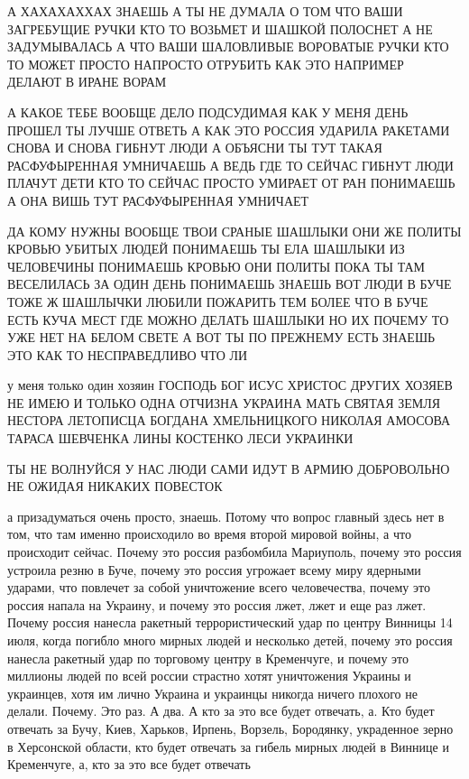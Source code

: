 А ХАХАХАХХАХ ЗНАЕШЬ А ТЫ НЕ ДУМАЛА О ТОМ ЧТО ВАШИ ЗАГРЕБУЩИЕ РУЧКИ КТО ТО
ВОЗЬМЕТ И ШАШКОЙ ПОЛОСНЕТ А НЕ ЗАДУМЫВАЛАСЬ А ЧТО ВАШИ ШАЛОВЛИВЫЕ ВОРОВАТЫЕ
РУЧКИ КТО ТО МОЖЕТ ПРОСТО НАПРОСТО ОТРУБИТЬ КАК ЭТО НАПРИМЕР ДЕЛАЮТ В ИРАНЕ
ВОРАМ

А КАКОЕ ТЕБЕ ВООБЩЕ ДЕЛО ПОДСУДИМАЯ КАК У МЕНЯ ДЕНЬ ПРОШЕЛ ТЫ ЛУЧШЕ ОТВЕТЬ А
КАК ЭТО РОССИЯ УДАРИЛА РАКЕТАМИ СНОВА И СНОВА ГИБНУТ ЛЮДИ А ОБЪЯСНИ ТЫ ТУТ
ТАКАЯ РАСФУФЫРЕННАЯ УМНИЧАЕШЬ А ВЕДЬ ГДЕ ТО СЕЙЧАС ГИБНУТ ЛЮДИ ПЛАЧУТ ДЕТИ КТО
ТО СЕЙЧАС ПРОСТО УМИРАЕТ ОТ РАН ПОНИМАЕШЬ А ОНА ВИШЬ ТУТ РАСФУФЫРЕННАЯ УМНИЧАЕТ

ДА КОМУ НУЖНЫ ВООБЩЕ ТВОИ СРАНЫЕ ШАШЛЫКИ ОНИ ЖЕ ПОЛИТЫ КРОВЬЮ УБИТЫХ ЛЮДЕЙ
ПОНИМАЕШЬ ТЫ ЕЛА ШАШЛЫКИ ИЗ ЧЕЛОВЕЧИНЫ ПОНИМАЕШЬ КРОВЬЮ ОНИ ПОЛИТЫ ПОКА ТЫ ТАМ
ВЕСЕЛИЛАСЬ ЗА ОДИН ДЕНЬ ПОНИМАЕШЬ ЗНАЕШЬ ВОТ ЛЮДИ В БУЧЕ ТОЖЕ Ж ШАШЛЫЧКИ ЛЮБИЛИ
ПОЖАРИТЬ ТЕМ БОЛЕЕ ЧТО В БУЧЕ ЕСТЬ КУЧА МЕСТ ГДЕ МОЖНО ДЕЛАТЬ ШАШЛЫКИ НО ИХ
ПОЧЕМУ ТО УЖЕ НЕТ НА БЕЛОМ СВЕТЕ А ВОТ ТЫ ПО ПРЕЖНЕМУ ЕСТЬ ЗНАЕШЬ ЭТО КАК ТО
НЕСПРАВЕДЛИВО ЧТО ЛИ

у меня только один хозяин ГОСПОДЬ БОГ ИСУС ХРИСТОС ДРУГИХ ХОЗЯЕВ НЕ ИМЕЮ И
ТОЛЬКО ОДНА ОТЧИЗНА УКРАИНА МАТЬ СВЯТАЯ ЗЕМЛЯ НЕСТОРА ЛЕТОПИСЦА БОГДАНА
ХМЕЛЬНИЦКОГО НИКОЛАЯ АМОСОВА ТАРАСА ШЕВЧЕНКА ЛИНЫ КОСТЕНКО ЛЕСИ УКРАИНКИ

ТЫ НЕ ВОЛНУЙСЯ У НАС ЛЮДИ САМИ ИДУТ В АРМИЮ ДОБРОВОЛЬНО НЕ ОЖИДАЯ НИКАКИХ
ПОВЕСТОК

а призадуматься очень просто, знаешь. Потому что вопрос главный здесь нет в
том, что там именно происходило во время второй мировой войны, а что происходит
сейчас. Почему это россия разбомбила Мариуполь, почему это россия устроила
резню в Буче, почему это россия угрожает всему миру ядерными ударами, что
повлечет за собой уничтожение всего человечества, почему это россия напала на
Украину, и почему это россия лжет, лжет и еще раз лжет. Почему россия нанесла
ракетный террористический удар по центру Винницы 14 июля, когда погибло много
мирных людей и несколько детей, почему это россия нанесла ракетный удар по
торговому центру в Кременчуге, и почему это миллионы людей по всей россии
страстно хотят уничтожения Украины и украинцев, хотя им лично Украина и
украинцы никогда ничего плохого не делали. Почему. Это раз. А два. А кто за это
все будет отвечать, а. Кто будет отвечать за Бучу, Киев, Харьков, Ирпень,
Ворзель, Бородянку, украденное зерно в Херсонской области, кто будет отвечать
за гибель мирных людей в Виннице и Кременчуге, а, кто за это все будет отвечать

